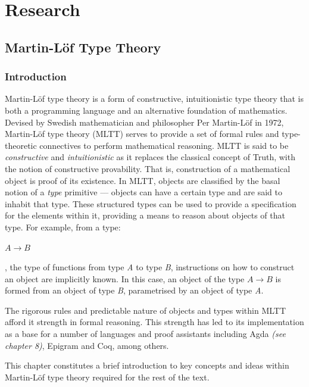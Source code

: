 \documentclass[12pt]{report}
\begin{document}
\part{Research}
\chapter{Martin-L\"of Type Theory}
\section{Introduction}
Martin-L\"of type theory is a form of constructive, intuitionistic type theory that is both a programming language and an alternative foundation of mathematics. Devised by Swedish mathematician and philosopher Per Martin-L\"of in 1972, Martin-L\"of type theory (MLTT) serves to provide a set of formal rules and type-theoretic connectives to perform mathematical reasoning.
MLTT is said to be \textit{constructive} and \textit{intuitionistic} as it replaces the classical concept of Truth, with the notion of constructive provability. That is, construction of a mathematical object is proof of its existence. In MLTT, objects are classified by the basal notion of a \textit{type} primitive --- objects can have a certain type and are said to inhabit that type. These structured types can be used to provide a specification for the elements within it, providing a means to reason about objects of that type. For example, from a type:
\begin{center}
$A \rightarrow B$
\end{center}
, the type of functions from type \textit{A} to type \textit{B}, instructions on how to construct an object are implicitly known. In this case, an object of the type $A \rightarrow B$ is formed from an object of type \textit{B}, parametrised by an object of type \textit{A}.

The rigorous rules and predictable nature of objects and types within MLTT afford it strength in formal reasoning. This strength has led to its implementation as a base for a number of languages and proof assistants including Agda \textit{(see chapter 8)}, Epigram and Coq, among others.

This chapter constitutes a brief introduction to key concepts and ideas within Martin-L\"of type theory required for the rest of the text.
\end{document}
